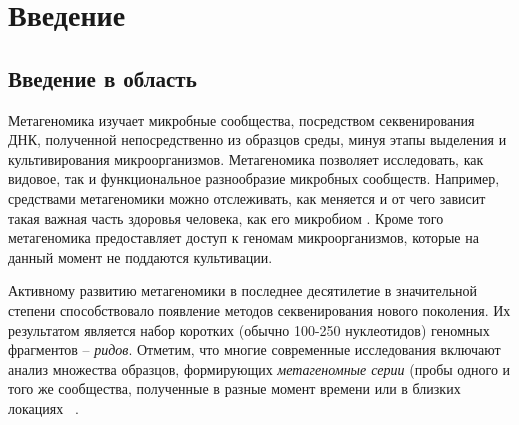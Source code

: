 \documentclass{spbau-diploma}
\begin{document}


\maketitle


\tableofcontents


\section*{Введение}

\subsection{Введение в область} 
Метагеномика  изучает микробные сообщества, посредством секвенирования ДНК, полученной непосредственно из образцов среды, минуя этапы выделения и культивирования микроорганизмов. Метагеномика позволяет исследовать, как видовое, так и функциональное разнообразие микробных сообществ. Например, средствами метагеномики можно отслеживать, как меняется и от чего зависит такая важная часть здоровья человека, как его микробиом \cite{HMP1, HMP2}. Кроме того метагеномика предоставляет доступ к геномам микроорганизмов, которые на данный момент не поддаются культивации.

Активному развитию метагеномики в последнее десятилетие в значительной степени способствовало появление методов секвенирования нового поколения. Их результатом является набор коротких (обычно 100-250 нуклеотидов) геномных фрагментов -- \textit{ридов}. 
Отметим, что многие современные исследования включают анализ множества образцов, формирующих \textit{метагеномные серии} (пробы одного и того же сообщества, полученные в разные момент времени \cite{time_series} или в близких локациях ~\cite{spacial_series_1, spacial_series_2}.
\end{document}
